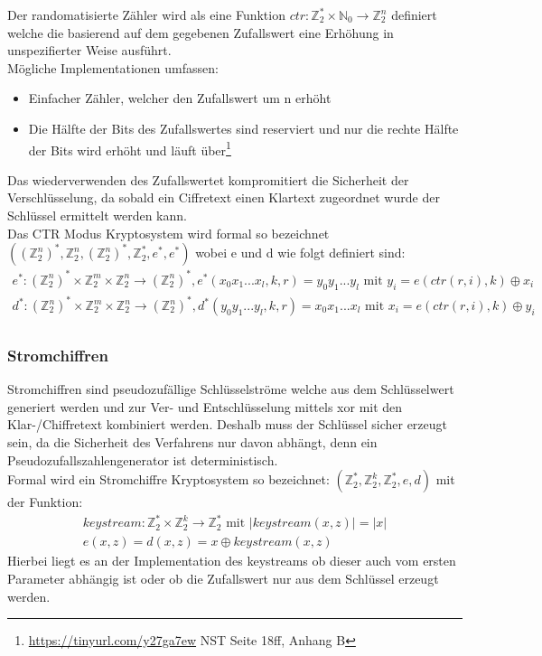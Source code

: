 \documentclass[a4paper,12pt]{article}
\begin{document}
Der randomatisierte Zähler wird als eine Funktion $ctr: \mathbb{Z}_2^*\times \mathbb{N}_0\rightarrow \mathbb{Z}_2^n$  definiert welche die basierend auf dem gegebenen Zufallswert eine Erhöhung in unspezifierter Weise ausführt.\\
Mögliche Implementationen umfassen:
\begin{itemize}
\item Einfacher Zähler, welcher den Zufallswert um n erhöht
\item  Die Hälfte der Bits des Zufallswertes sind reserviert und nur die rechte Hälfte der Bits wird erhöht und läuft über\footnote{\url{https://tinyurl.com/y27ga7ew} NST Seite 18ff, Anhang B}
\end{itemize}
Das wiederverwenden des Zufallswertet kompromitiert die Sicherheit der Verschlüsselung, da sobald ein Ciffretext einen Klartext zugeordnet wurde der Schlüssel ermittelt werden kann.\\
Das CTR Modus Kryptosystem wird formal so bezeichnet $((\mathbb{Z}_2^n)^*,\mathbb{Z}_2^n,(\mathbb{Z}_2^n)^*,\mathbb{Z}_2^*,e^*,e^*)$ wobei e und d wie folgt definiert sind:
\begin{align*}
e^*:(\mathbb{Z}_2^n)^*\times \mathbb{Z}_2^m \times \mathbb{Z}_2^n\rightarrow (\mathbb{Z}_2^n)^*, e^*(x_0x_1...x_l,k,r)=y_0y_1...y_l \textrm{ mit } y_i = e(ctr(r,i),k)\oplus x_i\\
d^*:(\mathbb{Z}_2^n)^*\times \mathbb{Z}_2^m \times \mathbb{Z}_2^n\rightarrow (\mathbb{Z}_2^n)^*, d^*(y_0y_1...y_l,k,r)=x_0x_1...x_l \textrm{ mit } x_i = e(ctr(r,i),k)\oplus y_i\\
\end{align*}
\subsubsection{Stromchiffren}
Stromchiffren sind pseudozufällige Schlüsselströme welche aus dem Schlüsselwert generiert werden und zur Ver- und Entschlüsselung mittels xor mit den Klar-/Chiffretext kombiniert werden. Deshalb muss der Schlüssel sicher erzeugt sein, da die Sicherheit des Verfahrens nur davon abhängt, denn ein Pseudozufallszahlengenerator ist deterministisch.\\
Formal wird ein Stromchiffre Kryptosystem so bezeichnet: $(\mathbb{Z}_2^*,\mathbb{Z}_2^k,\mathbb{Z}_2^*,e,d)$ mit der Funktion:
\begin{align*}
keystream: \mathbb{Z}_2^*\times \mathbb{Z}_2^k\rightarrow\mathbb{Z}_2^* \textrm{ mit } |keystream(x,z)|=|x|\\
e(x,z)=d(x,z) = x\oplus keystream(x,z)
\end{align*}
Hierbei liegt es an der Implementation des keystreams ob dieser auch vom ersten Parameter abhängig ist oder ob die Zufallswert nur aus dem Schlüssel erzeugt werden.
\end{document}
